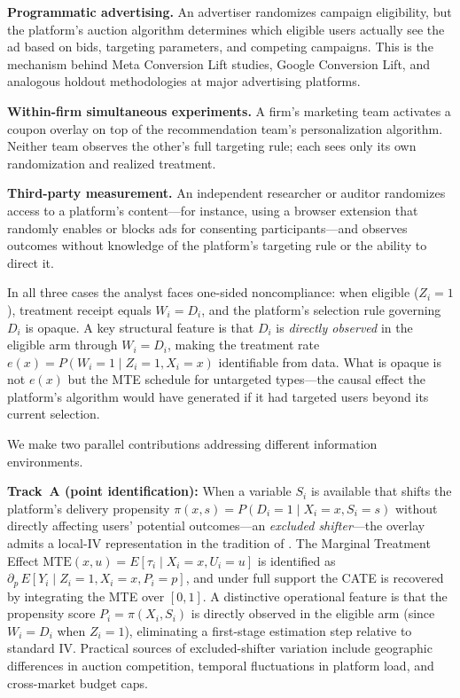 \documentclass[11pt]{article}
\begin{document}
\textbf{Programmatic advertising.}  An advertiser randomizes campaign
eligibility, but the platform's auction algorithm determines which eligible
users actually see the ad based on bids, targeting parameters, and competing
campaigns.  This is the mechanism behind Meta Conversion Lift studies, Google
Conversion Lift, and analogous holdout methodologies at major advertising
platforms.

\textbf{Within-firm simultaneous experiments.}  A firm's marketing team
activates a coupon overlay on top of the recommendation team's personalization
algorithm.  Neither team observes the other's full targeting rule; each sees
only its own randomization and realized treatment.

\textbf{Third-party measurement.}  An independent researcher or auditor
randomizes access to a platform's content---for instance, using a browser
extension that randomly enables or blocks ads for consenting participants---and
observes outcomes without knowledge of the platform's targeting rule or the
ability to direct it.

In all three cases the analyst faces one-sided noncompliance: when eligible
($Z_i = 1$), treatment receipt equals $W_i = D_i$, and the platform's selection
rule governing $D_i$ is opaque.  A key structural feature is that $D_i$ is
\emph{directly observed} in the eligible arm through $W_i = D_i$, making the
treatment rate $e(x) = P(W_i=1 \mid Z_i=1, X_i=x)$ identifiable from data.
What is opaque is not $e(x)$ but the MTE schedule for untargeted types---the
causal effect the platform's algorithm would have generated if it had targeted
users beyond its current selection.

We make two parallel contributions addressing different information environments.

\textbf{Track~A (point identification):} When a variable $S_i$ is available
that shifts the platform's delivery propensity $\pi(x,s) = P(D_i=1 \mid X_i=x,
S_i=s)$ without directly affecting users' potential outcomes---an \emph{excluded
shifter}---the overlay admits a local-IV representation in the tradition of
\citet{heckman2005structural}.  The Marginal Treatment Effect
$\mathrm{MTE}(x,u) = E[\tau_i \mid X_i=x, U_i=u]$ is identified as
$\partial_p\, E[Y_i \mid Z_i=1, X_i=x, P_i=p]$, and under full support the CATE
is recovered by integrating the MTE over $[0,1]$.  A distinctive operational
feature is that the propensity score $P_i = \pi(X_i, S_i)$ is directly observed
in the eligible arm (since $W_i = D_i$ when $Z_i = 1$), eliminating a
first-stage estimation step relative to standard IV.  Practical sources of
excluded-shifter variation include geographic differences in auction competition,
temporal fluctuations in platform load, and cross-market budget caps.
\end{document}
